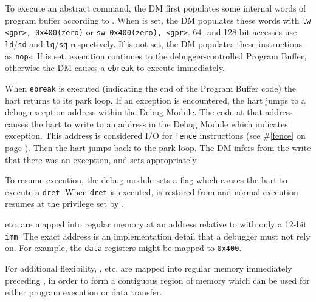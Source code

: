To execute an abstract command, the DM first populates some internal words of
program buffer according to \RdmCommand. When \FacAccessregisterTransfer is set, the DM
populates these words with {\tt lw <gpr>, 0x400(zero)} or {\tt sw 0x400(zero), <gpr>}.
64- and 128-bit accesses use {\tt ld}/{\tt sd} and {\tt lq}/{\tt sq}
respectively. If \FacAccessregisterTransfer is not set, the DM populates these instructions as {\tt nop}s.
If \FcsrMcontrolExecute is set, execution continues to the debugger-controlled Program Buffer,
otherwise the DM causes a {\tt ebreak} to execute immediately.

When {\tt ebreak} is executed (indicating the end of the
Program Buffer code) the hart returns to its park loop. If an exception is
encountered, the hart jumps to a debug exception address within
the Debug Module. The code at that address causes the hart to
write to an address in the Debug Module which indicates exception.
This address is considered I/O for {\tt fence} instructions (see \#\ref{fence}
on page \pageref{fence}).
Then the hart jumps back to the park loop.
The DM infers from the write that there was an exception, and sets \FdmAbstractcsCmderr appropriately.

To resume execution, the debug module sets a flag which causes the hart to execute a {\tt dret}.
When {\tt dret} is executed, \Rpc is restored from \RcsrDpc and normal execution resumes at the
privilege set by \FcsrDcsrPrv.

\RdmDataZero etc. are mapped into regular memory at an address relative to \Rzero
with only a 12-bit {\tt imm}. The exact address is an implementation
detail that a debugger must not rely on. For example, the {\tt data}
registers might be mapped to {\tt 0x400}.

For additional flexibility, \RdmProgbufZero, etc. are mapped into regular memory
immediately preceding \RdmDataZero, in order to form a contiguous region of memory which
can be used for either program execution or data transfer.
